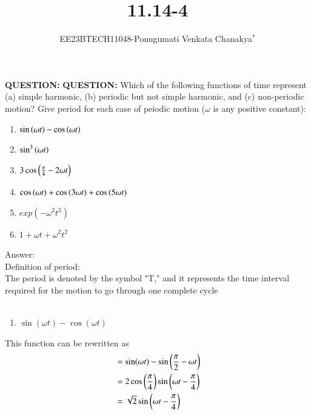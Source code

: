 \documentclass[journal,12pt,twocolumn]{IEEEtran}
\theoremstyle{remark}
\begin{document}
 
 \vspace{3cm}
 \title{\textbf{11.14-4}}
 \author{EE23BTECH11048-Ponugumati Venkata Chanakya$^{*}$%
 }
 \maketitle
 \newpage
 \bigskip
 \renewcommand{\thefigure}{\theenumi}
 \renewcommand{\thetable}{\theenumi}
 \textbf{QUESTION:}
 \textbf{QUESTION:}
 Which of the following functions of time represent (a) simple harmonic, (b) periodic
 but not simple harmonic, and (c) non-periodic motion? Give period for each case of
 peiodic motion ($\omega$ is any positive constant):\\
 \begin{enumerate}
 \item $\sin\left(\omega t\right)-\cos\left(\omega t\right)$\\
 \item $\sin^3\left(\omega t\right)$\\
 \item $3\cos\left(\frac{\pi}{4}- 2\omega t\right)$\\
 \item $\cos\left(\omega t\right)+\cos\left(3\omega t\right)+\cos\left(5\omega t\right)$\\
 \item $exp(-\omega^2 t^2)$\\
 \item $1+\omega t+\omega^2 t^2$\\
  \end{enumerate}
 Answer:\\
   Definition of period:\\The period is denoted by the symbol "T," and it represents the time interval required for the motion to go through one complete cycle\\
   \\
   \begin{enumerate}
 \item $\sin(\omega t)- \cos(\omega t)$\\
  \end{enumerate}
  This function can be rewritten as\\ 
 \begin{align}
  &= \sin(\omega t) - \sin\left(\frac{\pi}{2} - \omega t\right)\\
  &=2 \cos\left(\frac{\pi}{4}\right) \sin\left(\omega t - \frac{\pi}{4}\right)\\
  &=\sqrt{2}\sin\left(\omega t - \frac{\pi}{4}\right)
 \end{align}
\end{document}
